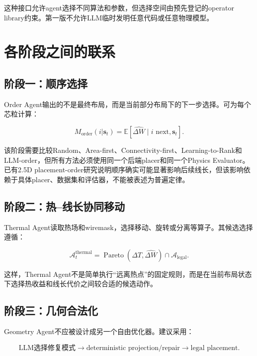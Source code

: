 \documentclass[UTF8,a4paper,12pt]{ctexart}
\newcommand{\state}{\boldsymbol{s}}
\begin{document}
这种接口允许agent选择不同算法和参数，但选择空间由预先登记的operator library约束。第一版不允许LLM临时发明任意代码或任意物理模型。

\section{各阶段之间的联系}

\subsection{阶段一：顺序选择}

Order Agent输出的不是最终布局，而是当前部分布局下的下一步选择。可为每个芯粒计算：

\begin{equation}
M_{\mathrm{order}}(i|\state_t)=
\mathbb E[\widehat{\Delta W}\mid i\text{ next},\state_t].
\end{equation}

该阶段需要比较Random、Area-first、Connectivity-first、Learning-to-Rank和LLM-order，但所有方法必须使用同一个后端placer和同一个Physics Evaluator。已有2.5D placement-order研究说明顺序确实可能显著影响后续线长，但该影响依赖于具体placer、数据集和评估器，不能被表述为普遍定律。

\subsection{阶段二：热--线长协同移动}

Thermal Agent读取热场和wiremask，选择移动、旋转或分离等算子。其候选选择遵循：

\begin{equation}
\mathcal A_t^{\mathrm{thermal}}=
\operatorname{Pareto}
\left(\Delta T,\widehat{\Delta W}\right)
\cap\mathcal A_{\mathrm{legal}}.
\end{equation}

这样，Thermal Agent不是简单执行“远离热点”的固定规则，而是在当前布局状态下选择热收益和线长代价之间较合适的候选动作。

\subsection{阶段三：几何合法化}

Geometry Agent不应被设计成另一个自由优化器。建议采用：

\begin{equation}
\text{LLM选择修复模式}
\rightarrow
\text{deterministic projection/repair}
\rightarrow
\text{legal placement}.
\end{equation}
\end{document}

